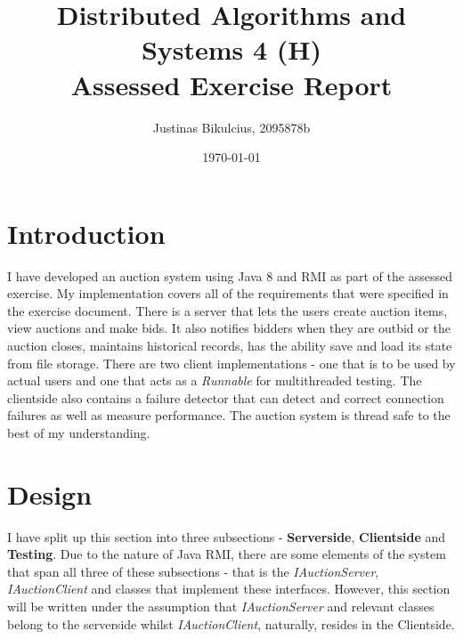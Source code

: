 \documentclass[10pt]{article}
\author{Justinas Bikulcius, 2095878b}
\title{Distributed Algorithms and Systems 4 (H)\\Assessed Exercise Report}
\date{\today{}}
\begin{document}
\maketitle
\pagebreak

\section{Introduction}
I have developed an auction system using Java 8 and RMI as part of the assessed exercise. My implementation covers all of the requirements that were specified in the exercise document. There is a server that lets the users create auction items, view auctions and make bids. It also notifies bidders when they are outbid or the auction closes, maintains historical records, has the ability save and load its state from file storage. There are two client implementations - one that is to be used by actual users and one that acts as a \textit{Runnable} for multithreaded testing. The clientside also contains a failure detector that can detect and correct connection failures as well as measure performance. The auction system is thread safe to the best of my understanding.

\section{Design}
I have split up this section into three subsections - \textbf{Serverside}, \textbf{Clientside} and \textbf{Testing}. Due to the nature of Java RMI, there are some elements of the system that span all three of these subsections - that is the \textit{IAuctionServer}, \textit{IAuctionClient} and classes that implement these interfaces. However, this section will be written under the assumption that \textit{IAuctionServer} and relevant classes belong to the serverside whilst \textit{IAuctionClient}, naturally, resides in the Clientside.
\end{document}
